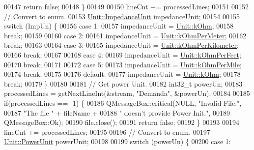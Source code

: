 \begin{DoxyCode}
00147     \textcolor{keywordflow}{return} \textcolor{keyword}{false};
00148   \}
00149 
00150   lineCnt += processedLines;
00151 
00152 \textcolor{comment}{// Convert to enum.}
00153   \hyperlink{class_unit_a3747e779c805df24a71961290be3fbdf}{Unit::ImpedanceUnit} impedanceUnit;
00154 
00155   \textcolor{keywordflow}{switch} (ImpUn) \{
00156   \textcolor{keywordflow}{case} 1:
00157     impedanceUnit = \hyperlink{class_unit_a3747e779c805df24a71961290be3fbdfa6b9c74d1763eefbaf751eeecff0bd9da}{Unit::kOhm};
00158     \textcolor{keywordflow}{break};
00159 
00160   \textcolor{keywordflow}{case} 2:
00161     impedanceUnit = \hyperlink{class_unit_a3747e779c805df24a71961290be3fbdfa35e9ca44deb5a35fdb576111cf0db336}{Unit::kOhmPerMeter};
00162     \textcolor{keywordflow}{break};
00163 
00164   \textcolor{keywordflow}{case} 3:
00165     impedanceUnit = \hyperlink{class_unit_a3747e779c805df24a71961290be3fbdfa56a0289d2ddeff7ca4aa8ba410df79d6}{Unit::kOhmPerKilometer};
00166     \textcolor{keywordflow}{break};
00167 
00168   \textcolor{keywordflow}{case} 4:
00169     impedanceUnit = \hyperlink{class_unit_a3747e779c805df24a71961290be3fbdfa433b57934ca3be960ec7a60f3ea6ea87}{Unit::kOhmPerFeet};
00170     \textcolor{keywordflow}{break};
00171 
00172   \textcolor{keywordflow}{case} 5:
00173     impedanceUnit = \hyperlink{class_unit_a3747e779c805df24a71961290be3fbdfa1d5bb04c9ecda66b09891af21cd4f613}{Unit::kOhmPerMile};
00174     \textcolor{keywordflow}{break};
00175 
00176   \textcolor{keywordflow}{default}:
00177     impedanceUnit = \hyperlink{class_unit_a3747e779c805df24a71961290be3fbdfa6b9c74d1763eefbaf751eeecff0bd9da}{Unit::kOhm};
00178     \textcolor{keywordflow}{break};
00179   \}
00180 
00181   \textcolor{comment}{// Get power Unit.}
00182   int32\_t powerUn;
00183   processedLines = getNextLineInt(&stream, \textcolor{stringliteral}{"Demanda"}, &powerUn);
00184 
00185   \textcolor{keywordflow}{if}(processedLines == -1) \{
00186     QMessageBox::critical(NULL, \textcolor{stringliteral}{"Invalid File."},
00187                           \textcolor{stringliteral}{"The file "} + fileName +
00188                           \textcolor{stringliteral}{" doesn't provide Power Init."},
00189                           QMessageBox::Ok);
00190     file.close();
00191     \textcolor{keywordflow}{return} \textcolor{keyword}{false};
00192   \}
00193 
00194   lineCnt += processedLines;
00195 
00196   \textcolor{comment}{// Convert to enum.}
00197   \hyperlink{class_unit_ace265ae255370ccacfd5370337572c3b}{Unit::PowerUnit} powerUnit;
00198 
00199   \textcolor{keywordflow}{switch} (powerUn) \{
00200   \textcolor{keywordflow}{case} 1:

\end{DoxyCode}
